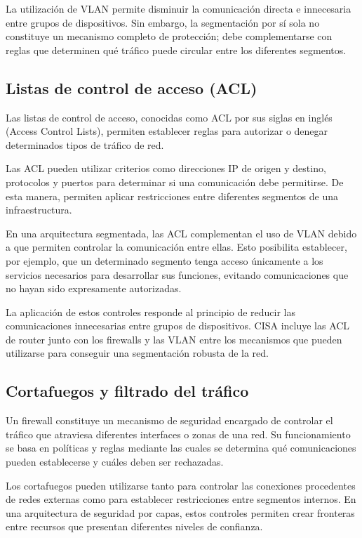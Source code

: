La utilización de VLAN permite disminuir la comunicación directa e innecesaria entre grupos de dispositivos. Sin embargo, la segmentación por sí sola no constituye un mecanismo completo de protección; debe complementarse con reglas que determinen qué tráfico puede circular entre los diferentes segmentos.

\subsection{Listas de control de acceso (ACL)}

Las listas de control de acceso, conocidas como ACL por sus siglas en inglés (Access Control Lists), permiten establecer reglas para autorizar o denegar determinados tipos de tráfico de red.

Las ACL pueden utilizar criterios como direcciones IP de origen y destino, protocolos y puertos para determinar si una comunicación debe permitirse. De esta manera, permiten aplicar restricciones entre diferentes segmentos de una infraestructura.

En una arquitectura segmentada, las ACL complementan el uso de VLAN debido a que permiten controlar la comunicación entre ellas. Esto posibilita establecer, por ejemplo, que un determinado segmento tenga acceso únicamente a los servicios necesarios para desarrollar sus funciones, evitando comunicaciones que no hayan sido expresamente autorizadas.

La aplicación de estos controles responde al principio de reducir las comunicaciones innecesarias entre grupos de dispositivos. CISA incluye las ACL de router junto con los firewalls y las VLAN entre los mecanismos que pueden utilizarse para conseguir una segmentación robusta de la red.



\subsection{Cortafuegos y filtrado del tráfico}

Un firewall constituye un mecanismo de seguridad encargado de controlar el tráfico que atraviesa diferentes interfaces o zonas de una red. Su funcionamiento se basa en políticas y reglas mediante las cuales se determina qué comunicaciones pueden establecerse y cuáles deben ser rechazadas.

Los cortafuegos pueden utilizarse tanto para controlar las conexiones procedentes de redes externas como para establecer restricciones entre segmentos internos. En una arquitectura de seguridad por capas, estos controles permiten crear fronteras entre recursos que presentan diferentes niveles de confianza.

